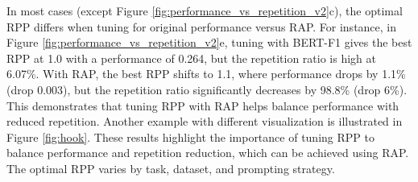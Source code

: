 In most cases (except Figure \ref{fig:performance_vs_repetition_v2}c), the optimal RPP differs when tuning for original performance versus RAP. For instance, in Figure \ref{fig:performance_vs_repetition_v2}e, tuning with BERT-F1 gives the best RPP at 1.0 with a performance of 0.264, but the repetition ratio is high at 6.07\%. With RAP, the best RPP shifts to 1.1, where performance drops by 1.1\% (drop 0.003), but the repetition ratio significantly decreases by 98.8\% (drop 6\%). This demonstrates that tuning RPP with RAP helps balance performance with reduced repetition. Another example with different visualization is illustrated in Figure \ref{fig:hook}. 
These results highlight the importance of tuning RPP to balance performance and repetition reduction, which can be achieved using RAP. The optimal RPP varies by task, dataset, and prompting strategy. 






